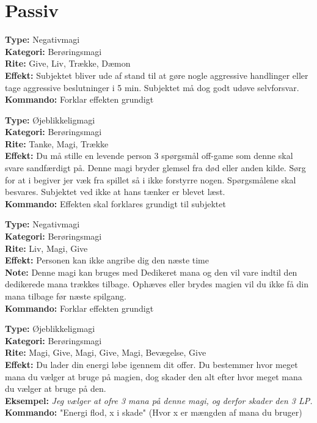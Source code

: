 \section{Passiv}

\begin{passiv*}
\textbf{Type:} Negativmagi\\
\textbf{Kategori:} Berøringsmagi\\
\textbf{Rite:} Give, Liv, Trække, Dæmon\\
\textbf{Effekt:} Subjektet bliver ude af stand til at gøre nogle aggressive handlinger eller tage aggressive beslutninger i 5 min. Subjektet må dog godt udøve selvforsvar.\\
\textbf{Kommando:} Forklar effekten grundigt
\end{passiv*}

\begin{passiv*}
\textbf{Type:} Øjeblikkeligmagi\\
\textbf{Kategori:} Berøringsmagi\\
\textbf{Rite:} Tanke, Magi, Trække\\
\textbf{Effekt:} Du må stille en levende person 3 spørgsmål off-game som denne skal svare sandfærdigt på. Denne magi bryder glemsel fra død eller anden kilde. Sørg for at i begiver jer væk fra spillet så i ikke forstyrre nogen. Spørgsmålene skal besvares. Subjektet ved ikke at hans tænker er blevet læst.\\
\textbf{Kommando:} Effekten skal forklares grundigt til subjektet
\end{passiv*}

\begin{passiv*}[Fred]
\textbf{Type:} Negativmagi\\
\textbf{Kategori:} Berøringsmagi\\
\textbf{Rite:} Liv, Magi, Give\\
\textbf{Effekt:} Personen kan ikke angribe dig den næste time\\
\textbf{Note:} Denne magi kan bruges med Dedikeret mana og den vil vare indtil den dedikerede mana trækkes tilbage. Ophæves eller brydes magien vil du ikke få din mana tilbage før næste spilgang.\\
\textbf{Kommando:} Forklar effekten grundigt
\end{passiv*}

\begin{passiv*}
\textbf{Type:} Øjeblikkeligmagi\\
\textbf{Kategori:} Berøringsmagi\\
\textbf{Rite:} Magi, Give, Magi, Give, Magi, Bevægelse, Give\\
\textbf{Effekt:} Du lader din energi løbe igennem dit offer. Du bestemmer hvor meget mana du vælger at bruge på magien, dog skader den alt efter hvor meget mana du vælger at bruge på den.\\
\textbf{Eksempel:} \textit{ Jeg vælger at ofre 3 mana på denne magi, og derfor skader den 3 LP.}\\
\textbf{Kommando:} "Energi flod, x i skade" (Hvor x er mængden af mana du bruger)\\
\end{passiv*}

